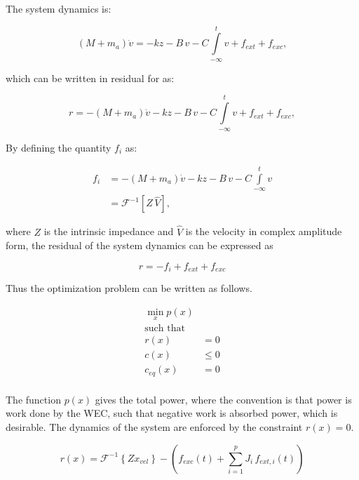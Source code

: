 \documentclass[]{article}
\begin{document}
The system dynamics is:

\begin{equation}
	(M + m_a) \dot{v} = - k z - B \, v - C \int\limits_{-\infty}^t v  + f_{ext} + f_{exc},
\end{equation}

\noindent{}which can be written in residual for as:

\begin{equation}
	r = -(M + m_a) \dot{v} - k z - B \, v - C \int\limits_{-\infty}^t v  + f_{ext} + f_{exc},
\end{equation}

By defining the quantity $f_i$ as:

\begin{subequations}
	\begin{align}
		f_i &= -(M + m_a) \dot{v} - k z - B \, v - C \int\limits_{-\infty}^t v \\
			&= \mathcal{F}^{-1} \left[ Z \, \hat{V}  \right] ,
	\end{align}
\end{subequations}

\noindent{}where $Z$ is the intrinsic impedance and $\hat{V}$ is the velocity in complex amplitude form, the residual of the system dynamics can be expressed as

\begin{equation}
	r = - f_i + f_{ext} + f_{exc}
\end{equation}

Thus the optimization problem can be written as follows.

\begin{equation}\label{eq:optimization_problem}
	\begin{aligned}
	\min_x p(x)&\\
	\textrm{such that }&\\
	r(x)&=0\\
	c(x)& \leq 0\\
	c_{eq}(x)&=0\\
	\end{aligned}
\end{equation}

\noindent{}The function $p(x)$ gives the total power, where the convention is that power is work done by the WEC, such that negative work is absorbed power, which is desirable.
The dynamics of the system are enforced by the constraint $r(x)=0$.

\begin{equation}\label{eq:residual_form}
	r(x) = \mathcal{F}^{-1}\left\{ Z x_{vel} \right\} - \left( f_{exc}(t) + \sum\limits_{i=1}^p J_i \, f_{ext,i}(t) \right)
\end{equation}
\end{document}
